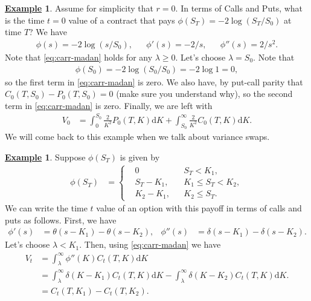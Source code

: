 \documentclass[12pt]{book}
\let\varphi\phi
\numberwithin{equation}{chapter}
\theoremstyle{plain}
\numberwithin{theorem}{section}
\theoremstyle{definition}
\newtheorem{example}[theorem]{\underline{Example}}
\numberwithin{exercise}{chapter}
\newcommand{\<}{\langle}
\renewcommand{\>}{\rangle}
\renewcommand{\(}{\left(}
\renewcommand{\)}{\right)}
\renewcommand{\[}{\left[}
\renewcommand{\]}{\right]}
\newcommand\lam{\lambda}
\newcommand\del{\delta}
\newcommand\dd{\mathrm{d}}
\theoremstyle{definition}
\numberwithin{question}{section}
\begin{document}
\begin{example}
Assume for simplicity that $r=0$.  In terms of Calls and Puts, what is the time $t=0$ value of a contract that pays $\varphi(S_T) = - 2 \log (S_T/S_0)$ at time $T$?  We have
\begin{align}
\varphi(s) = - 2 \log (s/S_0) , &&
\varphi'(s) = - 2/s , &&
\varphi''(s) =  2/s^2 .
\end{align}
Note that \eqref{eq:carr-madan} holds for any $\lam \geq 0$.  Let's choose $\lam = S_0$.  Note that
\begin{align}
\varphi(S_0) = - 2 \log (S_0 / S_0) = - 2 \log 1 = 0 ,
\end{align}
so the first term in \eqref{eq:carr-madan} is zero.  We also have, by put-call parity that $C_0(T,S_0) - P_0(T,S_0) = 0$ (make sure you understand why), so the second term in \eqref{eq:carr-madan} is zero.  Finally, we are left with
\begin{align}
V_0
	&=	\int_0^{S_0} \frac{2}{K^2} P_0(T,K) \dd K + \int_{S_0}^\infty \frac{2}{K^2} C_0(T,K) \dd K . 
\end{align}
We will come back to this example when we talk about variance swaps.
\end{example}

\begin{example}
Suppose $\varphi(S_T)$ is given by
\begin{align}
\varphi(S_T)
	&=	\left\{ \begin{aligned}
			&0 &&S_T < K_1 , \\
			&S_T - K_1, && K_1 \leq S_T < K_2 , \\
			&K_2 - K_1 , && K_2 \leq S_T .
			\end{aligned} \right.
\end{align}
We can write the time $t$ value of an option with this payoff in terms of calls and puts as follows.  First, we have
\begin{align}
\varphi'(s)
	&=	\theta(s - K_1) - \theta(s - K_2) , &
\varphi''(s)
	&=	\del(s - K_1) - \del(s - K_2) .
\end{align}
Let's choose $\lam < K_1$.  Then, using \eqref{eq:carr-madan} we have
\begin{align}
V_t &= \int_\lambda^\infty \varphi''(K) C_t(T,K) \dd K \\
	&=	\int_\lambda^\infty \del(K - K_1) C_t(T,K) \dd K - \int_\lambda^\infty \del(K - K_2) C_t(T,K) \dd K . \\
	&=	C_t(T,K_1) - C_t(T,K_2) .
\end{align}
\end{example}
\end{document}
